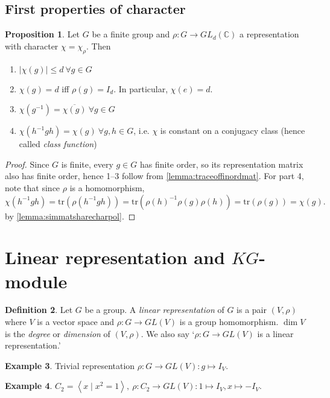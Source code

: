 \documentclass[a4paper]{article}
\newcommand{\tr}{\text{tr}}
\newcommand{\la}{\left\langle}
\newcommand{\ra}{\right\rangle}
\newcommand{\C}{\mathbb{C}}
\theoremstyle{definition}
\newtheorem{defn}{Definition}[subsection]
\newtheorem{prop}[defn]{Proposition}
\newtheorem{example}[defn]{Example}
\begin{document}
\subsection{First properties of character}
\begin{prop}
\label{prop:1stpropofchar}
Let $G$ be a finite group and $\rho:G\rightarrow GL_d(\C)$ a representation with character $\chi=\chi_\rho$. Then
\begin{enumerate}
\item $|\chi(g)|\leq d \ \forall g\in G$
\item $\chi(g)=d$ iff $\rho(g)=I_d$. In particular, $\chi(e)=d$.
\item $\chi\left(g^{-1}\right)=\overline{\chi(g)} \ \forall g\in G$
\item $\chi\left(h^{-1}gh\right)=\chi(g) \ \forall g,h\in G$, i.e. $\chi$ is constant on a conjugacy class (hence called \textit{class function})
\end{enumerate}
\end{prop}
\begin{proof}
Since $G$ is finite, every $g\in G$ has finite order, so its representation matrix also has finite order, hence 1–3 follow from \ref{lemma:traceoffinordmat}. For part 4, note that since $\rho$ is a homomorphism,
\[
\chi\left(h^{-1}gh\right)=\tr\left(\rho\left(h^{-1}gh\right)\right)=\tr\left(\rho(h)^{-1}\rho(g)\rho(h)\right)=\tr(\rho(g))=\chi(g).
\]
by \ref{lemma:simmatsharecharpol}.
\end{proof}

\section{Linear representation and $KG$-module}
\begin{defn}
Let $G$ be a group. A \textit{linear representation} of $G$ is a pair $(V,\rho)$ where $V$ is a vector space and $\rho:G\rightarrow GL(V)$ is a group homomorphism. $\dim V$ is the \textit{degree} or \textit{dimension} of $(V,\rho)$. We also say `$\rho:G\rightarrow GL(V)$ is a linear representation.'
\end{defn}

\begin{example}
Trivial representation $\rho:G\rightarrow GL(V):g\mapsto I_V$.
\end{example}

\begin{example}
$C_2=\la x \mid x^2=1\ra,\ \rho:C_2\rightarrow GL(V):1\mapsto I_V, x\mapsto -I_V$.
\end{example}
\end{document}
